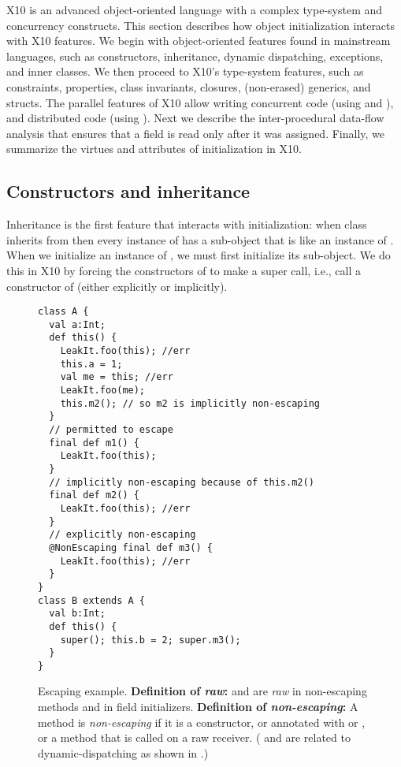 X10 is an advanced object-oriented language with a complex type-system
    and concurrency constructs.
This section describes how object initialization interacts with X10 features.
We begin with object-oriented features found in mainstream languages,
    such as constructors, inheritance, dynamic dispatching, exceptions, and inner classes.
We then proceed to X10's type-system features,
    such as constraints, properties, class invariants, closures, (non-erased) generics, and structs.
The parallel features of X10 allow writing concurrent code (using  and ),
    and distributed code (using ).
Next we describe the inter-procedural data-flow analysis that ensures that
    a field is read only after it was assigned.
Finally, we summarize the virtues and attributes of initialization in X10.


\subsection{Constructors and inheritance}
Inheritance is the first feature that interacts with initialization:
    when class  inherits from 
    then every instance of  has a sub-object that is like an instance of .
When we initialize an instance of , we must first initialize its  sub-object.
We do this in X10 by forcing the constructors of  to make a super call,
    i.e., call a constructor of 
    (either explicitly or implicitly).



\begin{figure}
\begin{lstlisting}
class A {
  val a:Int;
  def this() {
    LeakIt.foo(this); //err
    this.a = 1;
    val me = this; //err
    LeakIt.foo(me);
    this.m2(); // so m2 is implicitly non-escaping
  }
  // permitted to escape
  final def m1() {
    LeakIt.foo(this);
  }
  // implicitly non-escaping because of this.m2()
  final def m2() {
    LeakIt.foo(this); //err
  }
  // explicitly non-escaping
  @NonEscaping final def m3() {
    LeakIt.foo(this); //err
  }
}
class B extends A {
  val b:Int;
  def this() {
    super(); this.b = 2; super.m3();
  }
}
\end{lstlisting}
\caption{Escaping \this example.
    \textbf{Definition of \emph{raw}:}
    {\this and  are \emph{raw} in {non-escaping} methods and in field initializers}.
    \textbf{Definition of \emph{non-escaping}:}
        {A method is \emph{non-escaping} if it is a constructor,
            or annotated with  or ,
            or a method that is called on a raw \this receiver}.
    ( and  are related
        to dynamic-dispatching as shown in .)}
\label{Figure:Escaping-this}
\end{figure}

